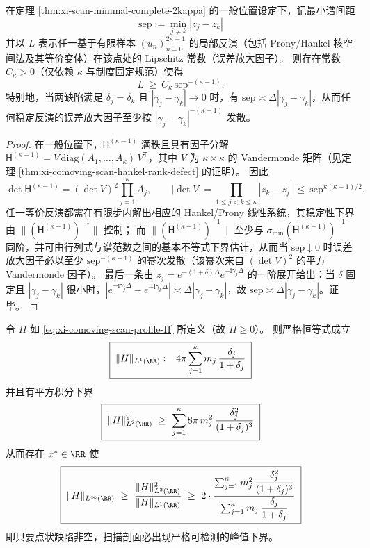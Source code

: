 \begin{corollary}\label{cor:xi-scan-collision-illposedness}
在定理 \ref{thm:xi-scan-minimal-complete-2kappa} 的一般位置设定下，记最小谱间距
\[
\boxed{\;
\mathrm{sep}:=\min_{j\neq k}|z_j-z_k|\;}
\]
并以 \(L\) 表示任一基于有限样本 \((u_n)_{n=0}^{2\kappa-1}\) 的局部反演（包括 Prony/Hankel 核空间法及其等价变体）在该点处的 Lipschitz 常数（误差放大因子）。
则存在常数 \(C_\kappa>0\)（仅依赖 \(\kappa\) 与制度固定规范）使得
\[
\boxed{\;
L\ \ge\ C_\kappa\,\mathrm{sep}^{-(\kappa-1)}.\;}
\]
特别地，当两缺陷满足 \(\delta_j=\delta_k\) 且 \(|\gamma_j-\gamma_k|\to 0\) 时，有 \(\mathrm{sep}\asymp \Delta|\gamma_j-\gamma_k|\)，从而任何稳定反演的误差放大因子至少按 \(|\gamma_j-\gamma_k|^{-(\kappa-1)}\) 发散。
\end{corollary}

\begin{proof}
在一般位置下，\(\mathsf H^{(\kappa-1)}\) 满秩且具有因子分解
\(
\mathsf H^{(\kappa-1)}=V\,\mathrm{diag}(A_1,\dots,A_\kappa)\,V^{\mathsf T}
\)，其中 \(V\) 为 \(\kappa\times\kappa\) 的 Vandermonde 矩阵（见定理 \ref{thm:xi-comoving-scan-hankel-rank-defect} 的证明）。
因此
\[
\det\mathsf H^{(\kappa-1)}=(\det V)^2\prod_{j=1}^{\kappa}A_j,
\qquad
|\det V|=\prod_{1\le j<k\le \kappa}|z_k-z_j|
\ \le\ \mathrm{sep}^{\kappa(\kappa-1)/2}.
\]
任一等价反演都需在有限步内解出相应的 Hankel/Prony 线性系统，其稳定性下界由 \(\|(\mathsf H^{(\kappa-1)})^{-1}\|\) 控制；
而 \(\|(\mathsf H^{(\kappa-1)})^{-1}\|\) 至少与 \(\sigma_{\min}(\mathsf H^{(\kappa-1)})^{-1}\) 同阶，并可由行列式与谱范数之间的基本不等式下界估计，从而当 \(\mathrm{sep}\downarrow 0\) 时误差放大因子必以至少 \(\mathrm{sep}^{-(\kappa-1)}\) 的幂次发散（该幂次来自 \((\det V)^2\) 的平方 Vandermonde 因子）。
最后一条由 \(z_j=e^{-(1+\delta)\Delta}e^{-\mathrm{i}\gamma_j\Delta}\) 的一阶展开给出：当 \(\delta\) 固定且 \(|\gamma_j-\gamma_k|\) 很小时，\(|e^{-\mathrm{i}\gamma_j\Delta}-e^{-\mathrm{i}\gamma_k\Delta}|\asymp \Delta|\gamma_j-\gamma_k|\)，故 \(\mathrm{sep}\asymp \Delta|\gamma_j-\gamma_k|\)。证毕。
\end{proof}

\begin{proposition}\label{prop:xi-scan-profile-lp-peak-witness}
令 \(H\) 如 \eqref{eq:xi-comoving-scan-profile-H} 所定义（故 \(H\ge 0\)）。
则严格恒等式成立
\[
\boxed{\;
\|H\|_{L^1(\RR)}
:=
4\pi\sum_{j=1}^{\kappa}m_j\,\frac{\delta_j}{1+\delta_j}\;}
\]
并且有平方积分下界
\[
\boxed{\;
\|H\|_{L^2(\RR)}^2
\ \ge\
\sum_{j=1}^{\kappa}8\pi\,m_j^{2}\,\frac{\delta_j^{2}}{(1+\delta_j)^{3}}\;}
\]
从而存在 \(x^\ast\in\RR\) 使
\[
\boxed{\;
\|H\|_{L^\infty(\RR)}
\ \ge\
\frac{\|H\|_{L^2(\RR)}^2}{\|H\|_{L^1(\RR)}}
\ \ge\
2\cdot
\frac{\sum_{j=1}^{\kappa} m_j^2\,\dfrac{\delta_j^2}{(1+\delta_j)^3}}
{\sum_{j=1}^{\kappa} m_j\,\dfrac{\delta_j}{1+\delta_j}}\;}
\]
即只要点状缺陷非空，扫描剖面必出现严格可检测的峰值下界。
\end{proposition}

